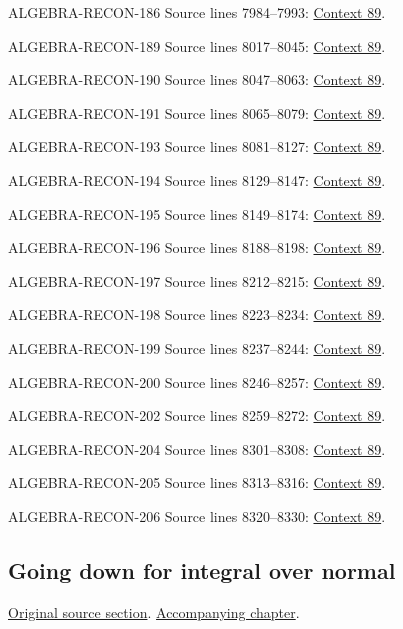 \begin{AlgebraSourceRoutes}
\item[ALGEBRA-RECON-186] Source lines 7984--7993: \hyperlink{algebra-context-089}{Context 89}.
\item[ALGEBRA-RECON-189] Source lines 8017--8045: \hyperlink{algebra-context-089}{Context 89}.
\item[ALGEBRA-RECON-190] Source lines 8047--8063: \hyperlink{algebra-context-089}{Context 89}.
\item[ALGEBRA-RECON-191] Source lines 8065--8079: \hyperlink{algebra-context-089}{Context 89}.
\item[ALGEBRA-RECON-193] Source lines 8081--8127: \hyperlink{algebra-context-089}{Context 89}.
\item[ALGEBRA-RECON-194] Source lines 8129--8147: \hyperlink{algebra-context-089}{Context 89}.
\item[ALGEBRA-RECON-195] Source lines 8149--8174: \hyperlink{algebra-context-089}{Context 89}.
\item[ALGEBRA-RECON-196] Source lines 8188--8198: \hyperlink{algebra-context-089}{Context 89}.
\item[ALGEBRA-RECON-197] Source lines 8212--8215: \hyperlink{algebra-context-089}{Context 89}.
\item[ALGEBRA-RECON-198] Source lines 8223--8234: \hyperlink{algebra-context-089}{Context 89}.
\item[ALGEBRA-RECON-199] Source lines 8237--8244: \hyperlink{algebra-context-089}{Context 89}.
\item[ALGEBRA-RECON-200] Source lines 8246--8257: \hyperlink{algebra-context-089}{Context 89}.
\item[ALGEBRA-RECON-202] Source lines 8259--8272: \hyperlink{algebra-context-089}{Context 89}.
\item[ALGEBRA-RECON-204] Source lines 8301--8308: \hyperlink{algebra-context-089}{Context 89}.
\item[ALGEBRA-RECON-205] Source lines 8313--8316: \hyperlink{algebra-context-089}{Context 89}.
\item[ALGEBRA-RECON-206] Source lines 8320--8330: \hyperlink{algebra-context-089}{Context 89}.
\end{AlgebraSourceRoutes}

\subsection{Going down for integral over normal}
\hypertarget{algebra-source-section-going-down-integral-over-normal}{}
\noindent\href{https://github.com/stacks/stacks-project/blob/a04446e57ec1fbc252a871afcec7752fb2807b14/algebra.tex\#L8339}{Original source section}. \href{algebra.pdf\#nameddest=section-going-down-integral-over-normal}{Accompanying chapter}.

